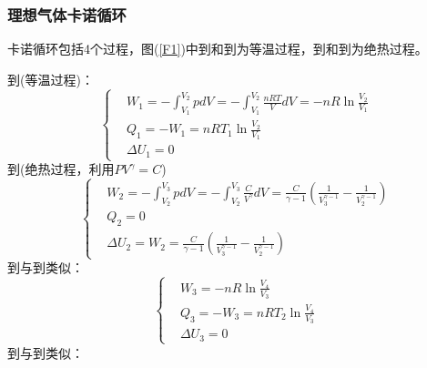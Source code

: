 \documentclass[12pt]{article}
\begin{document}
\subsubsection{理想气体卡诺循环}
\noindent

卡诺循环包括4个过程，图(\ref{F1})中\uppercase\expandafter{}到\uppercase\expandafter{}和\uppercase\expandafter{}到\uppercase\expandafter{}为等温过程，\uppercase\expandafter{}到\uppercase\expandafter{}和\uppercase\expandafter{}到\uppercase\expandafter{}为绝热过程。

\noindent \uppercase\expandafter{}到\uppercase\expandafter{}(等温过程)：
\begin{equation}
	\left \{
	\begin{split}
		&W_1=-\int_{{{V}_{1}}}^{{{V}_{2}}}{pdV=-\int_{{{V}_{1}}}^{{{V}_{2}}}{\frac{nRT}{V}}}dV=-nR\ln \frac{{{V}_{2}}}{{{V}_{1}}}\\
		&Q_1=-W_1=nRT_1\ln \frac{V_2}{V_1}\\
	   &\Delta U_1=0
	\end{split}
\right.
\end{equation}
\uppercase\expandafter{}到\uppercase\expandafter{}(绝热过程，利用$PV^\gamma=C$)
\begin{equation}
	\left \{
	\begin{split}
		&W_2=-\int_{{{V}_{2}}}^{{{V}_{3}}}{pdV=-\int_{{{V}_{2}}}^{{{V}_{3}}}{\frac{C}{V^\gamma}}}dV=\frac{C}{\gamma-1}(\frac{1}{V_3^{\gamma-1}}-\frac{1}{V_2^{\gamma-1}}) \\
		&Q_2=0\\
		&\Delta U_2=W_2=\frac{C}{\gamma-1}(\frac{1}{V_3^{\gamma-1}}-\frac{1}{V_2^{\gamma-1}})
	\end{split}\right.
\end{equation}
\uppercase\expandafter{}到\uppercase\expandafter{}与\uppercase\expandafter{}到\uppercase\expandafter{}类似：
\begin{equation}
	\left \{
	\begin{split}
		&W_3=-nR\ln \frac{{{V}_{4}}}{{{V}_{3}}}\\
		&Q_3=-W_3=nRT_2\ln \frac{V_4}{V_3}\\
		&\Delta U_3=0
	\end{split}\right.
\end{equation}
\uppercase\expandafter{}到\uppercase\expandafter{}与\uppercase\expandafter{}到\uppercase\expandafter{}类似：
\end{document}
